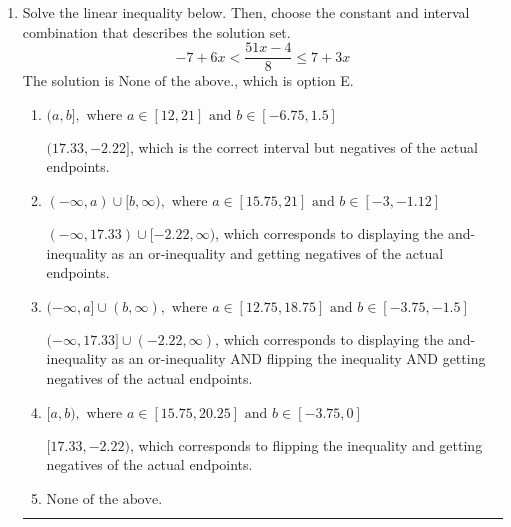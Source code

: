 \documentclass{extbook}[14pt]
\newcommand{\litem}[1]{\item #1

\rule{\textwidth}{0.4pt}}
\begin{document}
\begin{enumerate}
{\begin{enumerate}[label=\Alph*.]
Corresponds to including the endpoints (when they should be excluded).
\item \( (-\infty, a) \cup (b, \infty), \text{ where } a \in [-12.75, -5.25] \text{ and } b \in [-7.5, -1.5] \)

 * Correct option.
\item \( (-\infty, a) \cup (b, \infty), \text{ where } a \in [0.75, 7.5] \text{ and } b \in [5.25, 13.5] \)

Corresponds to inverting the inequality and negating the solution.
\item \( (-\infty, \infty) \)

Corresponds to the variable canceling, which does not happen in this instance.
\end{enumerate}

\textbf{General Comment:} When multiplying or dividing by a negative, flip the sign.
}
\litem{
Solve the linear inequality below. Then, choose the constant and interval combination that describes the solution set.
\[ -7 + 6 x < \frac{51 x - 4}{8} \leq 7 + 3 x \]The solution is \( \text{None of the above.} \), which is option E.\begin{enumerate}[label=\Alph*.]
\item \( (a, b], \text{ where } a \in [12, 21] \text{ and } b \in [-6.75, 1.5] \)

$(17.33, -2.22]$, which is the correct interval but negatives of the actual endpoints.
\item \( (-\infty, a) \cup [b, \infty), \text{ where } a \in [15.75, 21] \text{ and } b \in [-3, -1.12] \)

$(-\infty, 17.33) \cup [-2.22, \infty)$, which corresponds to displaying the and-inequality as an or-inequality and getting negatives of the actual endpoints.
\item \( (-\infty, a] \cup (b, \infty), \text{ where } a \in [12.75, 18.75] \text{ and } b \in [-3.75, -1.5] \)

$(-\infty, 17.33] \cup (-2.22, \infty)$, which corresponds to displaying the and-inequality as an or-inequality AND flipping the inequality AND getting negatives of the actual endpoints.
\item \( [a, b), \text{ where } a \in [15.75, 20.25] \text{ and } b \in [-3.75, 0] \)

$[17.33, -2.22)$, which corresponds to flipping the inequality and getting negatives of the actual endpoints.
\item \( \text{None of the above.} \)


\end{enumerate}}
\end{enumerate}
\end{document}
